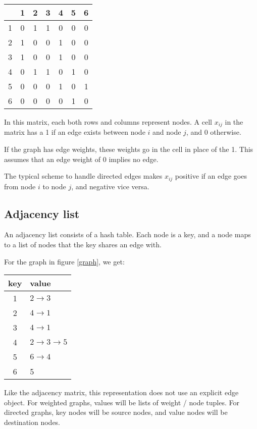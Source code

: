 \documentclass{article}
\begin{document}
\begin{center}
\begin{tabular}{c|cccccc}
& 1 & 2 & 3 & 4 & 5 & 6 \\
\hline
1 & 0 & 1 & 1 & 0 & 0 & 0 \\
2 & 1 & 0 & 0 & 1 & 0 & 0 \\
3 & 1 & 0 & 0 & 1 & 0 & 0 \\
4 & 0 & 1 & 1 & 0 & 1 & 0 \\
5 & 0 & 0 & 0 & 1 & 0 & 1 \\
6 & 0 & 0 & 0 & 0 & 1 & 0 \\
\end{tabular}
\end{center}
In this matrix, each both rows and columns represent nodes.  A cell $x_{ij}$ in the matrix has a 1 if an edge exists between node $i$ and node $j$, and 0 otherwise.

If the graph has edge weights, these weights go in the cell in place of the 1.  This assumes that an edge weight of 0 implies no edge.

The typical scheme to handle directed edges makes $x_{ij}$ positive if an edge goes from node $i$ to node $j$, and negative vice versa.

\subsection{Adjacency list}
An adjacency list consists of a hash table.  Each node is a key, and a node maps to a list of nodes that the key shares an edge with.

For the graph in figure \ref{graph}, we get:
\begin{center}
\begin{tabular}{c|l}
key & value \\
\hline
1 & $2 \rightarrow 3$ \\
2 & $4 \rightarrow 1$ \\
3 & $4 \rightarrow 1$ \\
4 & $2 \rightarrow 3 \rightarrow 5$ \\
5 & $6 \rightarrow 4$ \\
6 & 5 \\
\end{tabular}
\end{center}

Like the adjacency matrix, this representation does not use an explicit edge object.  For weighted graphs, values will be lists of weight / node tuples.  For directed graphs, key nodes will be source nodes, and value nodes will be destination nodes.
\end{document}
